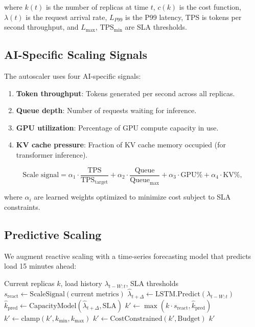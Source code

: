 \documentclass[11pt,twocolumn]{article}
\begin{document}
where $k(t)$ is the number of replicas at time $t$, $c(k)$ is the cost function, $\lambda(t)$ is the request arrival rate, $L_{P99}$ is the P99 latency, $\text{TPS}$ is tokens per second throughput, and $L_{\max}$, $\text{TPS}_{\min}$ are SLA thresholds.

\subsection{AI-Specific Scaling Signals}

The autoscaler uses four AI-specific signals:

\begin{enumerate}[leftmargin=1.4em]
    \item \textbf{Token throughput}: Tokens generated per second across all replicas.
    \item \textbf{Queue depth}: Number of requests waiting for inference.
    \item \textbf{GPU utilization}: Percentage of GPU compute capacity in use.
    \item \textbf{KV cache pressure}: Fraction of KV cache memory occupied (for transformer inference).
\end{enumerate}

\begin{equation}
\text{Scale signal} = \alpha_1 \cdot \frac{\text{TPS}}{\text{TPS}_{\text{target}}} + \alpha_2 \cdot \frac{\text{Queue}}{\text{Queue}_{\max}} + \alpha_3 \cdot \text{GPU\%} + \alpha_4 \cdot \text{KV\%},
\end{equation}

where $\alpha_i$ are learned weights optimized to minimize cost subject to SLA constraints.

\subsection{Predictive Scaling}

We augment reactive scaling with a time-series forecasting model that predicts load 15 minutes ahead:

\begin{algorithm}[H]
\caption{Predictive Autoscaler}
\label{alg:autoscaler}
\begin{algorithmic}[1]
\Require Current replicas $k$, load history $\lambda_{t-W:t}$, SLA thresholds
\State {}
\State $s_{\text{react}} \gets \text{ScaleSignal}(\text{current metrics})$
\State {}
\State $\hat{\lambda}_{t+\Delta} \gets \text{LSTM.Predict}(\lambda_{t-W:t})$
\State $\hat{k}_{\text{pred}} \gets \text{CapacityModel}(\hat{\lambda}_{t+\Delta}, \text{SLA})$
\State {}
\State $k' \gets \max(k \cdot s_{\text{react}}, \hat{k}_{\text{pred}})$
\State $k' \gets \text{clamp}(k', k_{\min}, k_{\max})$
\State {}
    \State $k' \gets \text{CostConstrained}(k', \text{Budget})$
\EndIf
\State \Return $k'$
\end{algorithmic}
\end{algorithm}
\end{document}
